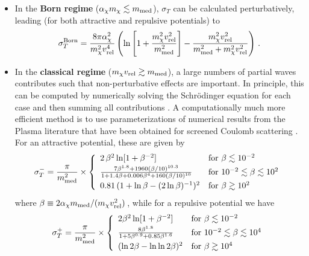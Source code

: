 \begin{itemize}
	\item In the \textbf{{Born} regime}  ($\alpha_\chi m_\chi \lesssim m_{\rm med}$), $\sigma_T$ 
	can be calculated perturbatively, leading (for both attractive and repulsive potentials) to~\cite{Feng:2009hw}
	\begin{equation}
	\sigma_T^{\rm Born} = \frac{8\pi \alpha_\chi^2}{m^2_\chi v^4_{\rm rel}} \left( \ln \left[1+\frac{m^2_\chi v^2_{\rm rel}}{m^2_{\rm med}} \right]-\frac{m^2_\chi v^2_{\rm rel}}{m^2_{\rm med}+m^2_\chi v^2_{\rm rel}}\right)\,.
	\label{sigmatborn}
	\end{equation}

	\item In the 
	\textbf{{classical} regime} ($m_\chi v_{\rm rel} \gtrsim m_{\rm med}$), a large numbers of partial waves
	contributes such that non-perturbative effects are important. In principle, this can be computed by numerically 
	solving the Schr\"odinger equation for each case and then summing all contributions  \cite{Tulin:2013teo}.
         A computationally much more efficient method is to use parameterizations \cite{Cyr-Racine:2015ihg} of 
         numerical results from the Plasma literature that have been obtained for screened Coulomb 
         scattering \cite{Khrapak:2003kjw,PhysRevE.70.056405}. For an attractive potential, these are given by
\smallskip         
	\begin{eqnarray}
	\sigma_T^{\mathbf{-}}= \frac{\pi}{m_{\rm med}^2}\times 
\left\{
    \begin{array}{ll}        
    2\, \beta^2 \ln[1+\beta^{-2}] & \textrm{for } \beta \lesssim 10^{-2} \\[0.5ex]
     \frac{7\beta^{1.8} +1960 (\beta/10)^{10.3}}{1+1.4\beta +0.006 \beta^4 +160(\beta/10)^{10}} & \textrm{for } 10^{-2} \lesssim \beta \lesssim 10^2\\[1ex]
                     0.81\,(1+\ln \beta -(2\ln\beta)^{-1})^2 & \textrm{for }  \beta \gtrsim 10^2  
 \end{array}
 \right.
 \label{sigmatclassicalattractive}
	\end{eqnarray}
\smallskip         
	where $\beta\equiv 2\alpha_\chi m_{\rm med}/(m_\chi v^2_{\rm rel})$\,, while for a repulsive potential we have 
\smallskip         
	\begin{eqnarray}
	\sigma_T^{\mathbf{+}}= \frac{\pi}{m_{\rm med}^2}\times 
\left\{
    \begin{array}{ll}        
  2\beta^2 \ln [1+\beta^{-2}] & \textrm{for } \beta \lesssim 10^{-2} \\[0.5ex]
    \frac{8\beta^{1.8}}{1+5\beta^{0.9} +0.85 \beta^{1.6}} & \textrm{for } 10^{-2} \lesssim \beta \lesssim 10^4\\[1ex]
	(\ln 2\beta -\ln\ln2\beta)^2 & \textrm{for } \beta \gtrsim 10^4
 \end{array}
 \right.
 \label{sigmatclassicalrepulsive}
	\end{eqnarray}
\smallskip         


\end{itemize}
